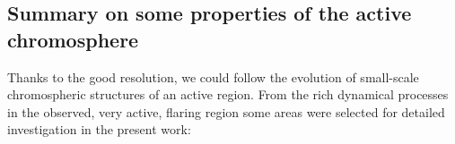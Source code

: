 \newpage
\subsection{Summary on some properties of the active chromosphere\label{conclusions}}

\begin{comment}
We have analysed a time sequence of two-dimensional spectrograms in H$\alpha$ from AR\,10875 at $\vartheta\approx36\degr$. The observations were taken with the G\"ottingen Fabry-Perot spectrometer at the Vacuum Tower Telescope at the Obsrvatorio del Teide/Tenerife. The series of 55~min duration, with a cadence or 22~s, shows high spatial resolution of better than 0\farcs5\ in H$\alpha$ and $\sim$0\farcs25 in the accompanying broadband images at 630~nm. 
\end{comment}
Thanks to the good resolution, we could follow the evolution of small-scale chromospheric structures of an active region. From the rich dynamical processes in the observed, very active, flaring region some areas were selected for detailed investigation in the present work:
